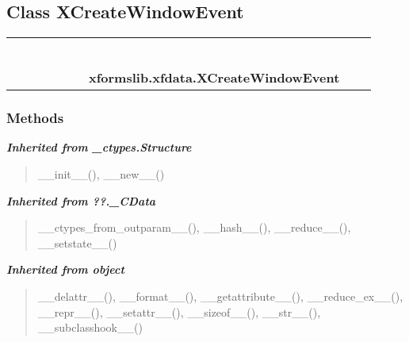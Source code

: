 \subsection{Class XCreateWindowEvent}

    \label{xformslib:xfdata:XCreateWindowEvent}
\begin{tabular}{cccccccccc}
\multicolumn{2}{r}{\settowidth{\BCL}{object}\multirow{2}{\BCL}{object}}
&&
&&
&&
  \\\cline{3-3}
  &&\multicolumn{1}{c|}{}
&&
&&
&&
  \\
\multicolumn{4}{r}{\settowidth{\BCL}{??.\_CData}\multirow{2}{\BCL}{??.\_CData}}
&&
&&
  \\\cline{5-5}
  &&&&\multicolumn{1}{c|}{}
&&
&&
  \\
\multicolumn{6}{r}{\settowidth{\BCL}{\_ctypes.Structure}\multirow{2}{\BCL}{\_ctypes.Structure}}
&&
  \\\cline{7-7}
  &&&&&&\multicolumn{1}{c|}{}
&&
  \\
&&&&&&\multicolumn{2}{l}{\textbf{xformslib.xfdata.XCreateWindowEvent}}
\end{tabular}



  \subsubsection{Methods}


\large{\textbf{\textit{Inherited from \_ctypes.Structure}}}

\begin{quote}
\_\_init\_\_(), \_\_new\_\_()
\end{quote}

\large{\textbf{\textit{Inherited from ??.\_CData}}}

\begin{quote}
\_\_ctypes\_from\_outparam\_\_(), \_\_hash\_\_(), \_\_reduce\_\_(), \_\_setstate\_\_()
\end{quote}

\large{\textbf{\textit{Inherited from object}}}

\begin{quote}
\_\_delattr\_\_(), \_\_format\_\_(), \_\_getattribute\_\_(), \_\_reduce\_ex\_\_(), \_\_repr\_\_(), \_\_setattr\_\_(), \_\_sizeof\_\_(), \_\_str\_\_(), \_\_subclasshook\_\_()
\end{quote}

